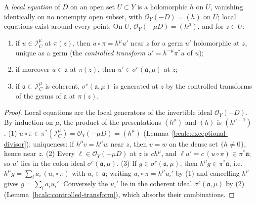 \begin{lemma}
\label{bcalc:function-transform}
\mixedleanok
A \emph{local equation} of \(D\) on an open set \(U\subset Y\) is a holomorphic \(h\) on \(U\), vanishing identically on no nonempty open
subset, with \(\mathcal O_Y(-D)=(h)\) on \(U\); local equations exist around every point. On \(U\), \(\mathcal O_Y(-\mu D)=(h^{\mu})\), and for
\(z\in U\):
\begin{enumerate}
\item if \(u\in\mathcal I_C^{\mu}\) at \(\pi(z)\), then \(u\circ\pi=h^{\mu}u'\) near \(z\) for a germ \(u'\) holomorphic at \(z\), unique as a germ
(the \emph{controlled transform} \(u'=h^{-\mu}\pi^*u\) of \(u\));
\item if moreover \(u\in\mathfrak a\) at \(\pi(z)\), then \(u'\in\sigma^{c}(\mathfrak a,\mu)\) at \(z\);
\item if \(\mathfrak a\subset\mathcal I_C^{\mu}\) is coherent, \(\sigma^{c}(\mathfrak a,\mu)\) is generated at \(z\) by the controlled transforms of the
germs of \(\mathfrak a\) at \(\pi(z)\).
\end{enumerate}
\end{lemma}
\begin{proof}
\mixedleanok
Local equations are the local generators of the invertible ideal \(\mathcal O_Y(-D)\). By induction on \(\mu\), the product of the
presentations \((h^{\mu})\) and \((h)\) is \((h^{\mu+1})\). (1) \(u\circ\pi\in\pi^*(\mathcal I_C^{\mu})=\mathcal O_Y(-\mu D)=(h^{\mu})\)
(Lemma~\ref{bcalc:exceptional-divisor}); uniqueness: if \(h^{\mu}v=h^{\mu}w\) near \(z\), then \(v=w\) on the dense set \(\{h\ne0\}\), hence near
\(z\). (2) Every \(\ell\in\mathcal O_Y(-\mu D)\) at \(z\) is \(ch^{\mu}\), and \(\ell u'=c\,(u\circ\pi)\in\pi^*\mathfrak a\); so \(u'\) lies in the colon ideal
\(\sigma^{c}(\mathfrak a,\mu)\). (3) If \(g\in\sigma^{c}(\mathfrak a,\mu)\), then \(h^{\mu}g\in\pi^*\mathfrak a\), i.e.\ \(h^{\mu}g=\sum_ia_i\,(u_i\circ\pi)\) with
\(u_i\in\mathfrak a\); writing \(u_i\circ\pi=h^{\mu}u_i'\) by (1) and cancelling \(h^{\mu}\) gives \(g=\sum_ia_iu_i'\). Conversely the \(u_i'\) lie in the
coherent ideal \(\sigma^{c}(\mathfrak a,\mu)\) by (2) (Lemma~\ref{bcalc:controlled-transform}), which absorbs their combinations.
\end{proof}

